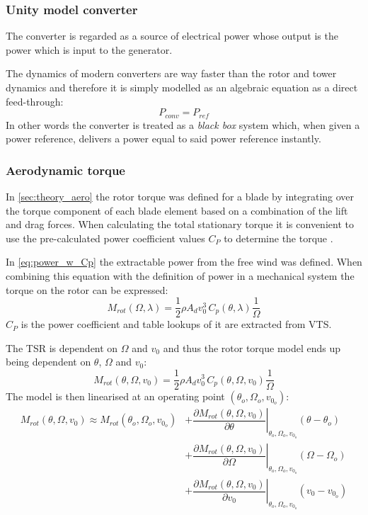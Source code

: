 \subsubsection{Unity model converter} \label{sec:wtLin_conv_unity}
The converter is regarded as a source of electrical power whose output is the power which is input to the generator.

The dynamics of modern converters are way faster than the rotor and tower dynamics and therefore it is simply modelled as an algebraic equation as a direct feed-through:
\begin{equation}\label{eq:wtLin_comp_convdft}
	P_{conv} = P_{ref}
\end{equation}
In other words the converter is treated as a \textit{black box} system which, when given a power reference, delivers a power equal to said power reference instantly.


\subsubsection{Aerodynamic torque} \label{sec:wtLin_aero_torque}
In \cref{sec:theory_aero} the rotor torque was defined for a blade by integrating over the torque component of each blade element based on a combination of the lift and drag forces. When calculating the total stationary torque it is convenient to use the pre-calculated power coefficient values $ C_P $ to determine the torque \cite{Knudsen2013}.

In \cref{eq:power_w_Cp} the extractable power from the free wind was defined. When combining this equation with the definition of power in a mechanical system the torque on the rotor can be expressed:
\begin{equation}\label{eq:wtLin_Mrot_lambda}
	M_{rot}(\Omega, \lambda) = \dfrac{1}{2} \rho A_d v_0^3 \, C_p(\theta, \lambda) \dfrac{1}{\Omega}
\end{equation}
$ C_P $ is the power coefficient and table lookups of it are extracted from VTS.

The TSR is dependent on $ \Omega $ and $ v_0 $ and thus the rotor torque model ends up being dependent on $ \theta $, $ \Omega $ and $ v_0 $:
\begin{equation}\label{eq:wtLin_Mrot_wind}
	M_{rot}(\theta, \Omega, v_0) = \dfrac{1}{2} \rho A_d v_0^3 \, C_p(\theta, \Omega, v_0) \dfrac{1}{\Omega}
\end{equation}
The model is then linearised at an operating point $ (\theta_o, \Omega_o, v_{0_o}) $:
\begin{align}
	M_{rot}(\theta, \Omega, v_0) \approx M_{rot}(\theta_o, \Omega_o, v_{0_o}) 
	& + \left. \dfrac{\partial M_{rot}(\theta, \Omega, v_0)}{\partial \theta} \right |_{\theta_o, \Omega_o, v_{0_o}} ( \theta-\theta_o) \\
	& + \left. \dfrac{\partial M_{rot}(\theta, \Omega, v_0)}{\partial \Omega} \right |_{\theta_o, \Omega_o, v_{0_o}} ( \Omega-\Omega_o) \\
	& + \left. \dfrac{\partial M_{rot}(\theta, \Omega, v_0)}{\partial v_0} \right |_{\theta_o, \Omega_o, v_{0_o}} ( v_0 - v_{0_o})
\end{align}


